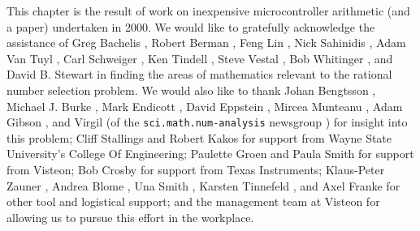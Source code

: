 This chapter is the result of work on inexpensive microcontroller 
arithmetic (and a paper) undertaken in 2000.
We would like to gratefully acknowledge the assistance
of 
      Greg Bachelis     \cite{bibref:i:gregbachelis}, 
      Robert Berman     \cite{bibref:i:robertberman}, 
           Feng Lin          \cite{bibref:i:fenglin}, 
     Nick Sahinidis    \cite{bibref:i:nicksahinidis}, 
      Adam Van Tuyl     \cite{bibref:i:adamvantuyl},
     Carl Schweiger    \cite{bibref:i:carlschweiger}, 
        Ken Tindell       \cite{bibref:i:kentindell},
       Steve Vestal      \cite{bibref:i:stevevestal},
      Bob Whitinger     \cite{bibref:i:bobwhitinger},
and 
   David B. Stewart   \cite{bibref:i:davidbstewart}
in finding the areas of
mathematics relevant to the rational number selection
problem.  We would also like to
thank 
    Johan Bengtsson    \cite{bibref:i:johanbengtsson},
   Michael J. Burke   \cite{bibref:i:michaeljburke},  
      Mark Endicott      \cite{bibref:i:markendicott}, 
     David Eppstein     \cite{bibref:i:davideppstein}, 
    Mircea Munteanu    \cite{bibref:i:mirceamunteanu},
        Adam Gibson        \cite{bibref:i:adamgibson}, 
and           Virgil             \cite{bibref:i:virgil}
(of the %
\texttt{sci.math.num-analysis} newsgroup 
\cite{bibref:n:scimathnumanalysis})
for insight into this problem; 
    Cliff Stallings    \cite{bibref:i:cliffstallings}
and
       Robert Kakos       \cite{bibref:i:robertkakos}
for support from Wayne State
University's College Of Engineering; 
     Paulette Groen     \cite{bibref:i:paulettegroen}
and
        Paula Smith        \cite{bibref:i:paulasmith}
for support from Visteon;
         Bob Crosby         \cite{bibref:i:bobcrosby}
for support
from Texas Instruments; 
 Klaus-Peter Zauner  \cite{bibref:i:klauspeterzauner},
       Andrea Blome        \cite{bibref:i:andreablome},
          Una Smith           \cite{bibref:i:unasmith},
  Karsten Tinnefeld   \cite{bibref:i:karstentinnefeld},
and
        Axel Franke         \cite{bibref:i:axelfranke}
for other tool
and logistical support; and the management
team at Visteon for allowing us to pursue this
effort in the workplace.



